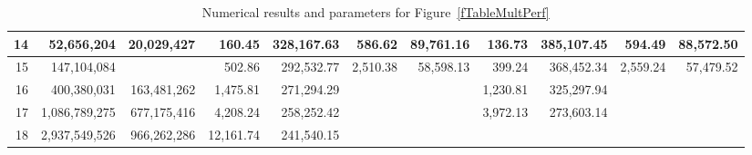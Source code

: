 \documentclass[conference]{IEEEtran}
\begin{document}
\begin{table*}[htb]
\begin{tabular}{|r|r|r|r|r|r|r|r|r|r|r|}
\hline                                                                                                               
14 & 52,656,204 & 20,029,427 & 160.45 & 328,167.63 & 586.62 & 89,761.16 & 136.73 & 385,107.45 & 594.49 & 88,572.50 \\
\hline                                                                                                               
15 & 147,104,084 &  & 502.86 & 292,532.77 & 2,510.38 & 58,598.13 & 399.24 & 368,452.34 & 2,559.24 & 57,479.52 \\     
\hline                                                                                                               
16 & 400,380,031 & 163,481,262 & 1,475.81 & 271,294.29 &  &  & 1,230.81 & 325,297.94 &  &  \\                        
\hline                                                                                                               
17 & 1,086,789,275 & 677,175,416 & 4,208.24 & 258,252.42 &  &  & 3,972.13 & 273,603.14 &  &  \\                      
\hline                                                                                                               
18 & 2,937,549,526 & 966,262,286 & 12,161.74 & 241,540.15 &  &  &  &  &  &  \\                                       
\hline                                                                                                               
\end{tabular}
\caption{Numerical results and parameters for Figure~\ref{fTableMultPerf}}
\label{ltable}
\end{table*}
\end{document}
